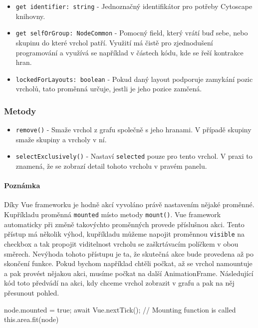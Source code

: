 \begin{itemize}
  \item \texttt{get identifier: string} - Jednoznačný identifikátor pro potřeby Cytoscape knihovny.

  \item \texttt{get selfOrGroup: NodeCommon} - Pomocný field, který vrátí buď sebe, nebo skupinu do které vrchol patří. Využití má čistě pro zjednodušení programování a využívá se například v částech kódu, kde se řeší kontrakce hran.

  \item \texttt{lockedForLayouts: boolean} - Pokud daný layout podporuje zamykání pozic vrcholů, tato proměnná určuje, jestli je jeho pozice zamčená.
\end{itemize}

\subsubsection*{Metody}
\begin{itemize}
  \item \texttt{remove()} - Smaže vrchol z grafu společně s jeho hranami. V případě skupiny smaže skupiny a vrcholy v ní.
  \item \texttt{selectExclusively()} - Nastaví \texttt{selected} pouze pro tento vrchol. V praxi to znamená, že se zobrazí detail tohoto vrcholu v pravém panelu.
\end{itemize}

\paragraph{Poznámka} Díky Vue frameworku je hodně akcí vyvoláno právě nastavením nějaké proměnné. Kupříkladu proměnná \texttt{mounted} místo metody \texttt{mount()}. Vue framework automaticky při změně takovýchto proměnných provede příslušnou akci. Tento přístup má několik výhod, kupříkladu můžeme napojit proměnnou \texttt{visible} na checkbox a tak propojit viditelnost vrcholu se zaškrtávacím políčkem v obou směrech. Nevýhoda tohoto přístupu je ta, že skutečná akce bude provedena až po skončení funkce. Pokud bychom například chtěli počkat, až se vrchol namountuje a pak provést nějakou akci, musíme počkat na další AnimationFrame. Následující kód toto předvádí na akci, kdy chceme vrchol zobrazit v grafu a pak na něj přesunout pohled.

\begin{code}
node.mounted = true;
await Vue.nextTick(); // Mounting function is called
this.area.fit(node)
\end{code}

